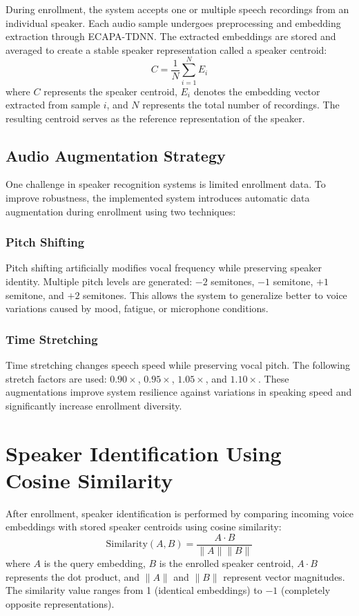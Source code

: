 \documentclass[12pt]{report}
\begin{document}
During enrollment, the system accepts one or multiple speech recordings from an individual speaker. Each audio sample undergoes preprocessing and embedding extraction through ECAPA-TDNN. The extracted embeddings are stored and averaged to create a stable speaker representation called a speaker centroid:
\[
C = \frac{1}{N} \sum_{i=1}^{N} E_i
\]
where $C$ represents the speaker centroid, $E_i$ denotes the embedding vector extracted from sample $i$, and $N$ represents the total number of recordings. The resulting centroid serves as the reference representation of the speaker.

\subsection{Audio Augmentation Strategy}

One challenge in speaker recognition systems is limited enrollment data. To improve robustness, the implemented system introduces automatic data augmentation during enrollment using two techniques:

\subsubsection{Pitch Shifting}
Pitch shifting artificially modifies vocal frequency while preserving speaker identity. Multiple pitch levels are generated: $-2$ semitones, $-1$ semitone, $+1$ semitone, and $+2$ semitones. This allows the system to generalize better to voice variations caused by mood, fatigue, or microphone conditions.

\subsubsection{Time Stretching}
Time stretching changes speech speed while preserving vocal pitch. The following stretch factors are used: $0.90\times$, $0.95\times$, $1.05\times$, and $1.10\times$. These augmentations improve system resilience against variations in speaking speed and significantly increase enrollment diversity.

\section{Speaker Identification Using Cosine Similarity}

After enrollment, speaker identification is performed by comparing incoming voice embeddings with stored speaker centroids using cosine similarity:
\[
\text{Similarity}(A, B) = \frac{A \cdot B}{\|A\| \|B\|}
\]
where $A$ is the query embedding, $B$ is the enrolled speaker centroid, $A \cdot B$ represents the dot product, and $\|A\|$ and $\|B\|$ represent vector magnitudes. The similarity value ranges from 1 (identical embeddings) to $-1$ (completely opposite representations).
\end{document}
